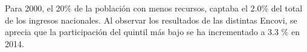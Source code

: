  Para 2000, el 20\% de la población con menos recursos, captaba el 2.0\% del total de los ingresos nacionales. Al observar los resultados de las distintas Encovi, se aprecia que la participación del quintil más bajo se ha incrementado a 3.3 \% en 2014.